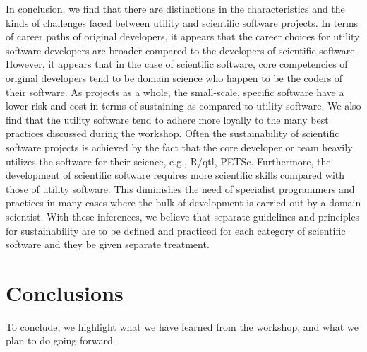 \documentclass[11pt, oneside]{amsart}
\newcommand{\todo}[1]{{\color{blue}$\blacksquare$~\textsf{[TODO: #1]}}}
\newcommand{\note}[1]{ {\textcolor{red}    { #1 }}}
\newcommand{\toolname}[1] {\textsf{#1}}
\begin{document}
In conclusion, we find that there are distinctions in the
characteristics and the kinds of challenges faced between utility and
scientific software projects.  In terms of career paths of original
developers, it appears that the career choices for utility software
developers are broader compared to the developers of scientific
software. However, it appears that in the case of scientific software,
core competencies of original developers tend to be domain science who
happen to be the coders of their software. As projects as a whole, the
small-scale, specific software have a lower risk and cost in terms of
sustaining as compared to utility software. We also find that the
utility software tend to adhere more loyally to the many best
practices discussed during the workshop. Often the sustainability of
scientific software projects is achieved by the fact that the core
developer or team heavily utilizes the software for their science,
e.g., \toolname{R/qtl, PETSc}.  Furthermore, the development of
scientific software requires more scientific skills compared with
those of utility software. This diminishes the need of specialist
programmers and practices in many cases where the bulk of development
is carried out by a domain scientist. With these inferences, we
believe that separate guidelines and principles for sustainability are to
be defined and practiced for each category of scientific software and
they be given separate treatment.



\section{Conclusions} \label{sec:conclusions}

To conclude, we highlight what we have learned from the workshop, and what we plan to do going forward.


\end{document}

